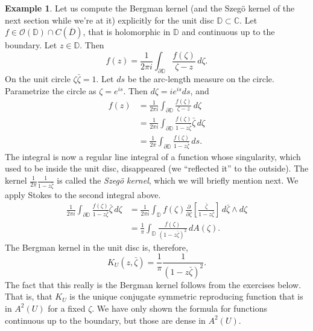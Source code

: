 \documentclass[12pt,openany]{book}
\newcommand{\C}{{\mathbb{C}}}
\newcommand{\D}{{\mathbb{D}}}
\newcommand{\sO}{{\mathcal{O}}}
\theoremstyle{plain}
\theoremstyle{remark}
\theoremstyle{definition}
\theoremstyle{exercise}
\theoremstyle{example}
\newtheorem{example}[thm]{Example}
\begin{document}
\begin{example}
%
%
Let us compute the Bergman kernel (and
the Szeg{\"o} kernel of the next section while we're at it)
explicitly for the
unit disc $\D \subset \C$.  Let $f \in \sO(\D) \cap C(\overline{D})$, that
is holomorphic in $\D$ and continuous up to the boundary.
Let $z \in \D$.
Then
\begin{equation*}
f(z) = \frac{1}{2\pi i} \int_{\partial \D} \frac{f(\zeta)}{\zeta-z} \,
d\zeta .
\end{equation*}
On the unit circle $\zeta \bar{\zeta} = 1$.  Let $ds$ be
the arc-length measure on the circle.  Parametrize the circle as $\zeta =
e^{is}$.
Then $d\zeta = i e^{is} ds$, and 
\begin{equation*}
\begin{split}
f(z) &= \frac{1}{2\pi i} \int_{\partial \D} \frac{f(\zeta)}{\zeta-z} \,
d\zeta \\
&= \frac{1}{2\pi i} \int_{\partial \D} \frac{f(\zeta)}{1-z\bar{\zeta}}
\bar{\zeta} \, d\zeta \\
&= \frac{1}{2\pi} \int_{\partial \D} \frac{f(\zeta)}{1-z\bar{\zeta}} \, ds .
\end{split}
\end{equation*}
The integral is now a regular line integral of a function whose
singularity, which used to be inside the unit disc, disappeared (we 
``reflected it'' to the outside).  The kernel 
$\frac{1}{2\pi} \frac{1}{1-z\bar{\zeta}}$ is called the
\emph{Szeg{\"o} kernel}, which we
will briefly mention next.  We apply Stokes to the second integral above.
\begin{equation*}
\begin{split}
\frac{1}{2\pi i} \int_{\partial \D} \frac{f(\zeta)}{1-z\bar{\zeta}}
\bar{\zeta} \, d\zeta 
&=
\frac{1}{2\pi i} \int_{\D} f(\zeta)
\frac{\partial}{\partial \bar{\zeta}} \left[
\frac{\bar{\zeta}}{1-z\bar{\zeta}} \right] \,
d\bar{\zeta} \wedge d\zeta 
\\
&=
\frac{1}{\pi} \int_{\D} 
\frac{f(\zeta)}{{(1-z\bar{\zeta})}^2} \, dA(\zeta) .
\end{split}
\end{equation*}
The Bergman kernel in the unit disc is, therefore,
\begin{equation*}
K_U(z,\bar{\zeta}) = \frac{1}{\pi} \frac{1}{{(1-z\bar{\zeta})}^2} .
\end{equation*}
The fact that this really is the Bergman kernel follows from the exercises
below.  That is, that $K_U$ is the unique conjugate symmetric
reproducing function that is in
$A^2(U)$ for a fixed $\zeta$.  
We have only shown the formula for functions continuous up to the boundary,
but those are dense in $A^2(U)$.
\end{example}
\end{document}
